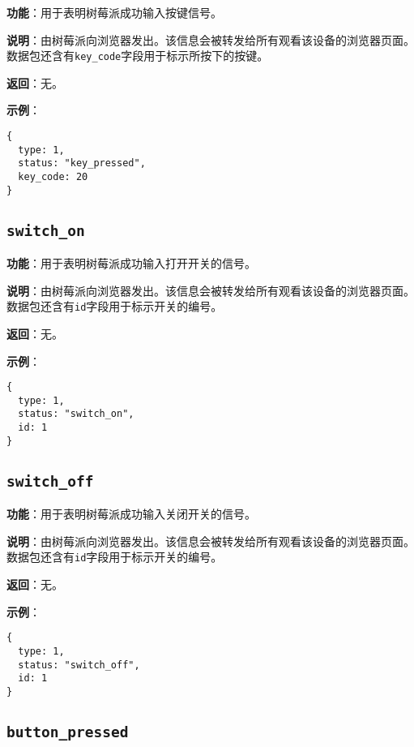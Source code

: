 \documentclass{article}
\begin{document}
\noindent\textbf{功能}：用于表明树莓派成功输入按键信号。

\noindent\textbf{说明}：由树莓派向浏览器发出。该信息会被转发给所有观看该设备的浏览器页面。数据包还含有\texttt{key\_code}字段用于标示所按下的按键。

\noindent\textbf{返回}：无。

\noindent\textbf{示例}：

\begin{lstlisting}[style=json]
{
  type: 1,
  status: "key_pressed",
  key_code: 20
}
\end{lstlisting}

\subsection{\texttt{switch\_on}}
\label{status:switch_on}

\noindent\textbf{功能}：用于表明树莓派成功输入打开开关的信号。

\noindent\textbf{说明}：由树莓派向浏览器发出。该信息会被转发给所有观看该设备的浏览器页面。数据包还含有\texttt{id}字段用于标示开关的编号。

\noindent\textbf{返回}：无。

\noindent\textbf{示例}：

\begin{lstlisting}[style=json]
{
  type: 1,
  status: "switch_on",
  id: 1
}
\end{lstlisting}

\subsection{\texttt{switch\_off}}
\label{status:switch_off}

\noindent\textbf{功能}：用于表明树莓派成功输入关闭开关的信号。

\noindent\textbf{说明}：由树莓派向浏览器发出。该信息会被转发给所有观看该设备的浏览器页面。数据包还含有\texttt{id}字段用于标示开关的编号。

\noindent\textbf{返回}：无。

\noindent\textbf{示例}：

\begin{lstlisting}[style=json]
{
  type: 1,
  status: "switch_off",
  id: 1
}
\end{lstlisting}

\subsection{\texttt{button\_pressed}}
\label{status:button_pressed}
\end{document}
